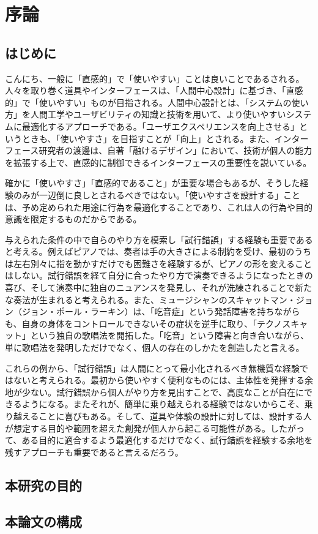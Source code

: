 \chapter{序論}
\section{はじめに}
こんにち、一般に「直感的」で「使いやすい」ことは良いことであるされる。人々を取り巻く道具やインターフェースは、「人間中心設計」に基づき、「直感的」で「使いやすい」ものが目指される。人間中心設計とは、「システムの使い方」を人間工学やユーザビリティの知識と技術を用いて、より使いやすいシステムに最適化するアプローチである。「ユーザエクスペリエンスを向上させる」というときも、「使いやすさ」を目指すことが「向上」とされる。また、インターフェース研究者の渡邊は、自著「融けるデザイン」において、技術が個人の能力を拡張する上で、直感的に制御できるインターフェースの重要性を説いている。

確かに「使いやすさ」「直感的であること」が重要な場合もあるが、そうした経験のみが一辺倒に良しとされるべきではない。「使いやすさを設計する」ことは、予め定められた用途に行為を最適化することであり、これは人の行為や目的意識を限定するものだからである。

与えられた条件の中で自らのやり方を模索し「試行錯誤」する経験も重要であると考える。例えばピアノでは、奏者は手の大きさによる制約を受け、最初のうちは左右別々に指を動かすだけでも困難さを経験するが、ピアノの形を変えることはしない。試行錯誤を経て自分に合ったやり方で演奏できるようになったときの喜び、そして演奏中に独自のニュアンスを発見し、それが洗練されることで新たな奏法が生まれると考えられる。また、ミュージシャンのスキャットマン・ジョン（ジョン・ポール・ラーキン）は、「吃音症」という発話障害を持ちながらも、自身の身体をコントロールできないその症状を逆手に取り、「テクノスキャット」という独自の歌唱法を開拓した。「吃音」という障害と向き合いながら、単に歌唱法を発明しただけでなく、個人の存在のしかたを創造したと言える。

これらの例から、「試行錯誤」は人間にとって最小化されるべき無機質な経験ではないと考えられる。最初から使いやすく便利なものには、主体性を発揮する余地が少ない。試行錯誤から個人がやり方を見出すことで、高度なことが自在にできるようになる。またそれが、簡単に乗り越えられる経験ではないからこそ、乗り越えることに喜びもある。そして、道具や体験の設計に対しては、設計する人が想定する目的や範囲を超えた創発が個人から起こる可能性がある。したがって、ある目的に適合するよう最適化するだけでなく、試行錯誤を経験する余地を残すアプローチも重要であると言えるだろう。

\section{本研究の目的}
\section{本論文の構成}